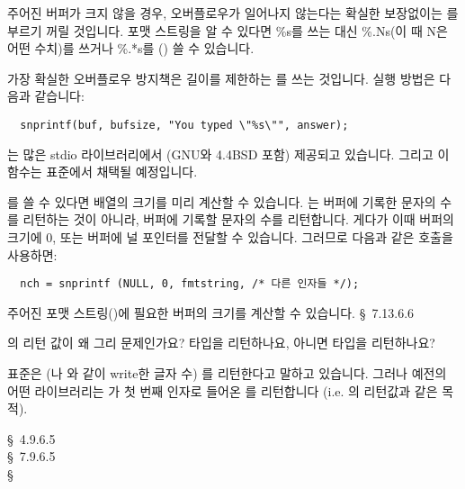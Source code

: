 \begin{faq}
	주어진 버퍼가 크지 않을 경우, 오버플로우가 일어나지 않는다는 
	확실한 보장없이는 를 부르기 꺼릴 것입니다.
	포맷 스트링을 알 수 있다면 \%s를 쓰는 대신 \%.Ns(이 때 N은 어떤 수치)를
	쓰거나 \%.*s를 () 쓸 수 있습니다.

	가장 확실한 오버플로우 방지책은 길이를 제한하는 를
	쓰는 것입니다.  실행 방법은 다음과 같습니다:
\begin{verbatim}
  snprintf(buf, bufsize, "You typed \"%s\"", answer);
\end{verbatim}

	는 많은 stdio 라이브러리에서 (GNU와 4.4BSD 포함)
	제공되고 있습니다.  그리고 이 함수는 \cite{c9x} 표준에서 채택될 예정입니다.

	\cite{c9x} 를 쓸 수 있다면 배열의 크기를 미리 계산할 수
	있습니다.
	\cite{c9x} 는 버퍼에 기록한 문자의 수를 리턴하는 것이 아니라,
	버퍼에 기록할 문자의 수를 리턴합니다.  게다가 이때 버퍼의 크기에
	0, 또는 버퍼에 널 포인터를 전달할 수 있습니다.  그러므로 다음과 같은
	호출을 사용하면:
\begin{verbatim}
  nch = snprintf (NULL, 0, fmtstring, /* 다른 인자들 */);
\end{verbatim}
	주어진 포맷 스트링()에 필요한 버퍼의 크기를
	계산할 수 있습니다.
\R
	\cite{c9x} \S\ 7.13.6.6
\end{faq}

\begin{faq}
	의 리턴 값이 왜 그리 문제인가요?
	 타입을 리턴하나요, 아니면  타입을 리턴하나요?

\A
	표준은 (나 와 같이 write한 글자 수)
	를 리턴한다고 말하고 있습니다.  그러나 예전의 어떤
	라이브러리는 가 첫 번째 인자로 들어온 를 
	리턴합니다 (i.e. 의 리턴값과 같은 목적).

\R
	\cite{ansi} \S\ 4.9.6.5 \\
	\cite{c89} \S\ 7.9.6.5 \\
	\cite{pcs} \S\ 
\end{faq}

